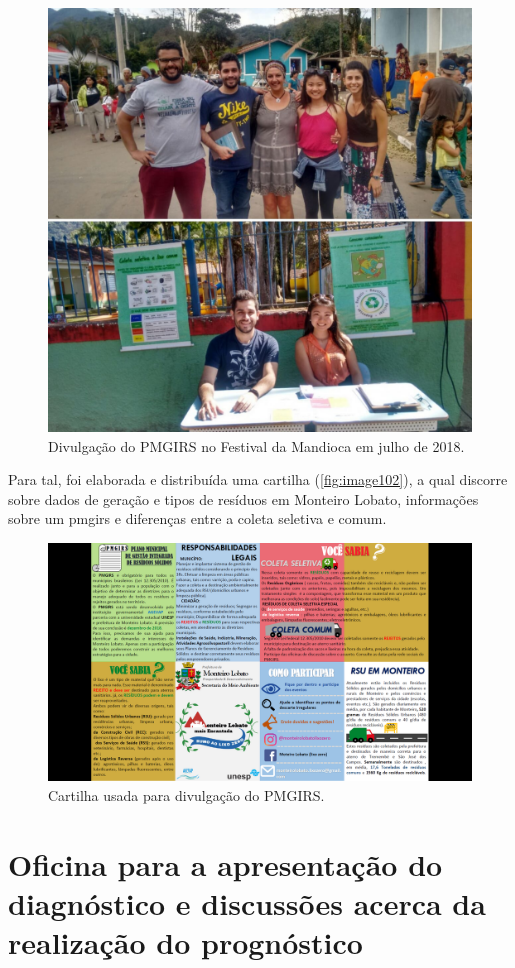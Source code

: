 \begin{figure}
	\centering
	\includegraphics[width=0.75\linewidth]{produtos/prodtres/image101}
	\caption{Divulgação do PMGIRS no Festival da Mandioca em julho de 2018.}
	\label{fig:image101}
\end{figure}

Para tal, foi elaborada e distribuída uma cartilha (\autoref{fig:image102}), a qual discorre sobre dados de geração e tipos de resíduos em Monteiro Lobato, informações sobre um \gls{pmgirs} e diferenças entre a coleta seletiva e comum.

\begin{figure}
	\centering
	\includegraphics[width=0.75\linewidth]{produtos/prodtres/image102}
	\caption{Cartilha usada para divulgação do PMGIRS.}
	\label{fig:image102}
\end{figure}

\newpage
\section{Oficina para a apresentação do diagnóstico e discussões acerca da realização do prognóstico}

